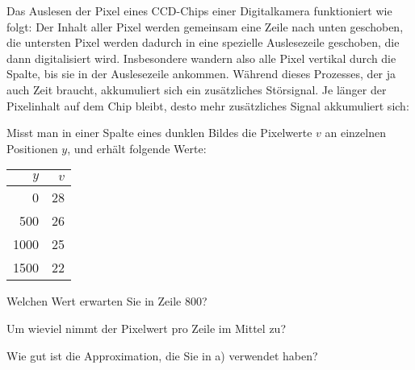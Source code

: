 Das Auslesen der Pixel eines CCD-Chips einer Digitalkamera funktioniert
wie folgt: Der Inhalt aller Pixel werden gemeinsam eine Zeile nach unten
geschoben,
die untersten Pixel werden dadurch in eine spezielle Auslesezeile geschoben,
die dann digitalisiert wird. Insbesondere wandern also alle Pixel vertikal
durch die Spalte, bis sie in der Auslesezeile ankommen.
Während dieses Prozesses, der ja auch Zeit braucht, akkumuliert sich
ein zusätzliches Störsignal. Je länger der Pixelinhalt auf dem Chip
bleibt, desto mehr zusätzliches Signal akkumuliert sich:
\begin{center}
\end{center}
Misst man in einer Spalte eines dunklen Bildes die Pixelwerte $v$ an
einzelnen Positionen $y$, und erhält folgende Werte:
\begin{center}
\begin{tabular}{|r|r|}
\hline
$y$&$v$\\
\hline
   0& 28\\
 500& 26\\
1000& 25\\
1500& 22\\
\hline
\end{tabular}
\end{center}
\begin{teilaufgaben}
\item Welchen Wert erwarten Sie in Zeile 800?
\item Um wieviel nimmt der Pixelwert pro Zeile im Mittel zu?
\item Wie gut ist die Approximation, die Sie in a) verwendet haben?
\end{teilaufgaben}


